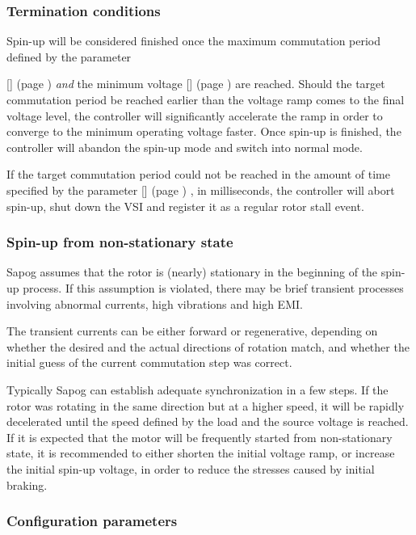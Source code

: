 \documentclass{zubaxdoc}
\newcommand{\CfgRef}[1]{
    \StrSubstitute{#1}{+}{\textunderscore}[\temp]
    \texttt{\temp} {\footnotesize (page \pageref{#1})}
}
\begin{document}
\subsubsection{Termination conditions}

Spin-up will be considered finished once the maximum commutation period defined by the parameter
\CfgRef{mot+comm+per+max} \emph{and} the minimum voltage \CfgRef{mot+v+min} are reached.
Should the target commutation period be reached earlier than the voltage ramp comes to the final
voltage level, the controller will significantly accelerate the ramp in order to converge to
the minimum operating voltage faster.
Once spin-up is finished, the controller will abandon the spin-up mode and switch into normal mode.

If the target commutation period could not be reached in the amount of time specified by
the parameter \CfgRef{mot+spup+to+ms}, in milliseconds, the controller will abort spin-up,
shut down the VSI and register it as a regular rotor stall event.

\subsubsection{Spin-up from non-stationary state}

Sapog assumes that the rotor is (nearly) stationary in the beginning of the spin-up process.
If this assumption is violated, there may be brief transient processes involving abnormal currents,
high vibrations and high EMI.

The transient currents can be either forward or regenerative, depending on whether the desired
and the actual directions of rotation match, and whether the initial guess of the current
commutation step was correct.

Typically Sapog can establish adequate synchronization in a few steps.
If the rotor was rotating in the same direction but at a higher speed,
it will be rapidly decelerated until the speed defined by the load and the source voltage is
reached.
If it is expected that the motor will be frequently started from non-stationary state,
it is recommended to either shorten the initial voltage ramp, or increase the initial
spin-up voltage, in order to reduce the stresses caused by initial braking.

\subsubsection{Configuration parameters}
\end{document}
